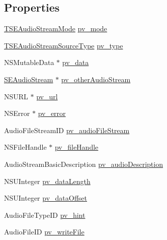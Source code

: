 \subsection*{Properties}
\begin{DoxyCompactItemize}
\item 
\hyperlink{_s_e_audio_stream_8h_a9689aa516925fa132495c3c8a719ba57}{T\-S\-E\-Audio\-Stream\-Mode} \hyperlink{category_s_e_audio_stream_07_08_ab3ea1257ebd508183804d76b4fabb59a}{pv\-\_\-mode}
\item 
\hyperlink{_s_e_audio_stream_8m_ab23d772523cd805a49196d237af16aa2}{T\-S\-E\-Audio\-Stream\-Source\-Type} \hyperlink{category_s_e_audio_stream_07_08_ab41d2bb3f3368b5d2e59f26bfb63f108}{pv\-\_\-type}
\item 
N\-S\-Mutable\-Data $\ast$ \hyperlink{category_s_e_audio_stream_07_08_a47ec9fee0bc8fe3ed1fedbb5bf3659de}{pv\-\_\-data}
\item 
\hyperlink{interface_s_e_audio_stream}{S\-E\-Audio\-Stream} $\ast$ \hyperlink{category_s_e_audio_stream_07_08_aa149aa8c3150db2e972f656382b276be}{pv\-\_\-other\-Audio\-Stream}
\item 
N\-S\-U\-R\-L $\ast$ \hyperlink{category_s_e_audio_stream_07_08_ac5062bf935bfe512908c148b64ebaa84}{pv\-\_\-url}
\item 
N\-S\-Error $\ast$ \hyperlink{category_s_e_audio_stream_07_08_a43937aa5b15468780d7b4e582c690366}{pv\-\_\-error}
\item 
Audio\-File\-Stream\-I\-D \hyperlink{category_s_e_audio_stream_07_08_a3d66ea999bebad5a9048f2f019ad7e9a}{pv\-\_\-audio\-File\-Stream}
\item 
N\-S\-File\-Handle $\ast$ \hyperlink{category_s_e_audio_stream_07_08_a4b5eb36068a2815dae1d2236824aea74}{pv\-\_\-file\-Handle}
\item 
Audio\-Stream\-Basic\-Description \hyperlink{category_s_e_audio_stream_07_08_a27b75ce98f8fe681b6de1b27ecc39df9}{pv\-\_\-audio\-Description}
\item 
N\-S\-U\-Integer \hyperlink{category_s_e_audio_stream_07_08_a908e9b0330fba1110c9ef04d26494729}{pv\-\_\-data\-Length}
\item 
N\-S\-U\-Integer \hyperlink{category_s_e_audio_stream_07_08_ac36ec8eab9c05e43ab0907663c3d172f}{pv\-\_\-data\-Offset}
\item 
Audio\-File\-Type\-I\-D \hyperlink{category_s_e_audio_stream_07_08_a7f4dc2a06927994d828cf7d7b52918be}{pv\-\_\-hint}
\item 
Audio\-File\-I\-D \hyperlink{category_s_e_audio_stream_07_08_a63651ad03f9f237a9bce2449ad37de67}{pv\-\_\-write\-File}
\end{DoxyCompactItemize}


